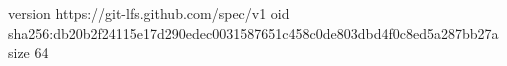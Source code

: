 version https://git-lfs.github.com/spec/v1
oid sha256:db20b2f24115e17d290edec0031587651c458c0de803dbd4f0c8ed5a287bb27a
size 64
